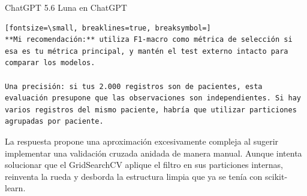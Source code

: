 \documentclass[12pt,a4paper,oneside]{book}
\begin{document}
\begin{iaresp}{ChatGPT 5.6 Luna en ChatGPT}
\begin{Verbatim}[fontsize=\small, breaklines=true, breaksymbol=]
**Mi recomendación:** utiliza F1-macro como métrica de selección si esa es tu métrica principal, y mantén el test externo intacto para comparar los modelos.

Una precisión: si tus 2.000 registros son de pacientes, esta evaluación presupone que las observaciones son independientes. Si hay varios registros del mismo paciente, habría que utilizar particiones agrupadas por paciente.
\end{Verbatim}
\end{iaresp}
\begin{iaanalisis}
La respuesta propone una aproximación excesivamente compleja al sugerir implementar una validación cruzada anidada de manera manual. Aunque intenta solucionar que el GridSearchCV aplique el filtro en sus particiones internas, reinventa la rueda y desborda la estructura limpia que ya se tenía con scikit-learn.
\end{iaanalisis}
\end{document}

